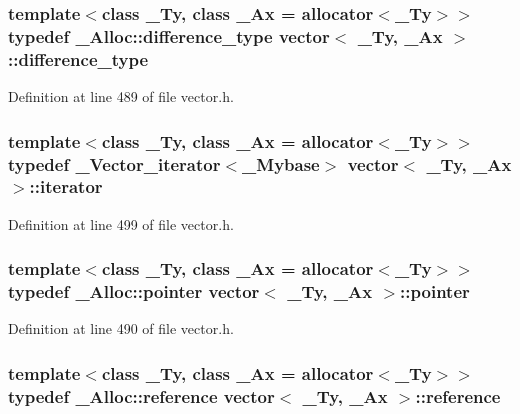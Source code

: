\hypertarget{classvector_a5972097c9d52210f29e2d753a75b0a7a}{
\subsubsection[{difference\+\_\+type}]{\setlength{\rightskip}{0pt plus 5cm}template$<$class \+\_\+\+Ty, class \+\_\+\+Ax = allocator$<$\+\_\+\+Ty$>$$>$ typedef \+\_\+\+Alloc\+::difference\+\_\+type {\bf vector}$<$ \+\_\+\+Ty, \+\_\+\+Ax $>$\+::{\bf difference\+\_\+type}}}\label{classvector_a5972097c9d52210f29e2d753a75b0a7a}


Definition at line 489 of file vector.\+h.

\hypertarget{classvector_a5a7a542bca0f55f43e161bd5a09c483d}{
\subsubsection[{iterator}]{\setlength{\rightskip}{0pt plus 5cm}template$<$class \+\_\+\+Ty, class \+\_\+\+Ax = allocator$<$\+\_\+\+Ty$>$$>$ typedef {\bf \+\_\+\+Vector\+\_\+iterator}$<${\bf \+\_\+\+Mybase}$>$ {\bf vector}$<$ \+\_\+\+Ty, \+\_\+\+Ax $>$\+::{\bf iterator}}}\label{classvector_a5a7a542bca0f55f43e161bd5a09c483d}


Definition at line 499 of file vector.\+h.

\hypertarget{classvector_a7f69707c8f1cc638260b523d48793523}{
\subsubsection[{pointer}]{\setlength{\rightskip}{0pt plus 5cm}template$<$class \+\_\+\+Ty, class \+\_\+\+Ax = allocator$<$\+\_\+\+Ty$>$$>$ typedef \+\_\+\+Alloc\+::pointer {\bf vector}$<$ \+\_\+\+Ty, \+\_\+\+Ax $>$\+::{\bf pointer}}}\label{classvector_a7f69707c8f1cc638260b523d48793523}


Definition at line 490 of file vector.\+h.

\hypertarget{classvector_a68d6b0f887c9e4d0f422a1e3900b9794}{
\subsubsection[{reference}]{\setlength{\rightskip}{0pt plus 5cm}template$<$class \+\_\+\+Ty, class \+\_\+\+Ax = allocator$<$\+\_\+\+Ty$>$$>$ typedef \+\_\+\+Alloc\+::reference {\bf vector}$<$ \+\_\+\+Ty, \+\_\+\+Ax $>$\+::{\bf reference}}}\label{classvector_a68d6b0f887c9e4d0f422a1e3900b9794}


